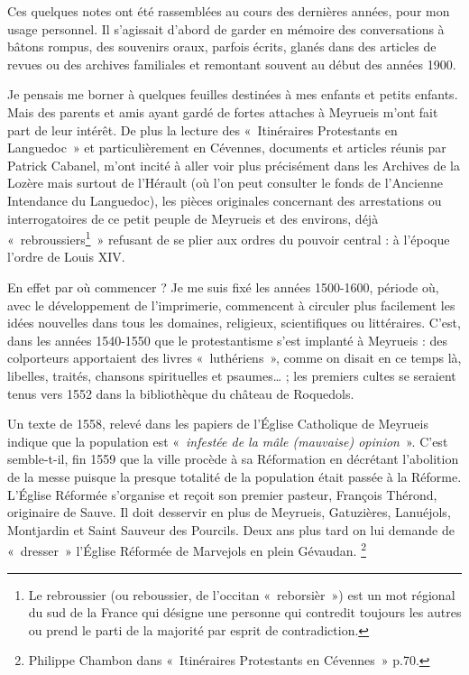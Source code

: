

\vspace{0.7em}

Ces quelques notes ont été rassemblées au cours des dernières années, pour mon usage personnel. Il s’agissait d’abord de garder en mémoire des conversations à bâtons rompus, des souvenirs oraux, parfois écrits, glanés dans des articles de revues ou des archives familiales et remontant souvent au début des années 1900.

Je pensais me borner à quelques feuilles destinées à mes enfants et petits enfants. Mais des parents et amis ayant gardé de fortes attaches à Meyrueis m’ont fait part de leur intérêt. De plus la lecture des «~Itinéraires Protestants en Languedoc~» et particulièrement en Cévennes, documents et articles réunis par Patrick Cabanel, m’ont incité à aller voir plus précisément dans les Archives de la Lozère mais surtout de l’Hérault (où l’on peut consulter le fonds de l’Ancienne Intendance du Languedoc), les pièces originales concernant des arrestations ou interrogatoires de ce petit peuple de Meyrueis et des environs, déjà «~rebroussiers\footnote{Le rebroussier (ou reboussier, de l'occitan «~reborsièr~») est un mot régional du sud de la France qui désigne une personne qui contredit toujours les autres ou prend le parti de la majorité par esprit de contradiction.}~» refusant de se plier aux ordres du pouvoir central : à l’époque l’ordre de Louis XIV.

En effet par où commencer ? Je me suis fixé les années 1500-1600, période où, avec le développement de l’imprimerie, commencent à circuler plus facilement les idées nouvelles dans tous les domaines, religieux, scientifiques ou littéraires. C’est, dans les années 1540-1550 que le protestantisme s’est implanté à Meyrueis : des colporteurs apportaient des livres «~luthériens~», comme on disait en ce temps là, libelles, traités, chansons spirituelles et psaumes… ; les premiers cultes se seraient tenus vers 1552 dans la bibliothèque du château de Roquedols.

Un texte de 1558, relevé dans les papiers de l’Église Catholique de Meyrueis indique que la population est «~\textit{infestée de la mâle (mauvaise) opinion}~». C’est semble-t-il, fin 1559 que la ville procède à sa Réformation en décrétant l’abolition de la messe puisque la presque totalité de la population était passée à la Réforme. L’Église Réformée s’organise et reçoit son premier pasteur, François Thérond, originaire de Sauve. Il doit desservir en plus de Meyrueis, Gatuzières, Lanuéjols, Montjardin et Saint Sauveur des Pourcils. Deux ans plus tard on lui demande de «~dresser~» l’Église Réformée de Marvejols en plein Gévaudan. \footnote{Philippe Chambon dans «~Itinéraires Protestants en Cévennes~» p.70.}

